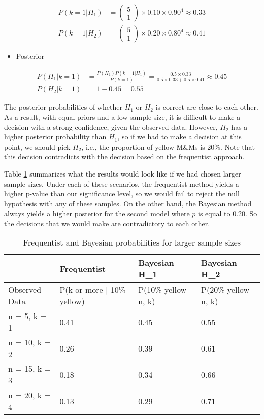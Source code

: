 \documentclass[]{book}
\providecommand{\tightlist}{%
  \setlength{\itemsep}{0pt}\setlength{\parskip}{0pt}}
\theoremstyle{definition}
\theoremstyle{definition}
\theoremstyle{remark}
\begin{document}
\[\begin{aligned}
P(k=1 | H_1) &= \left( \begin{array}{c} 5 \\ 1 \end{array} \right) \times 0.10 \times 0.90^4 \approx 0.33 \\
P(k=1 | H_2) &= \left( \begin{array}{c} 5 \\ 1 \end{array} \right) \times 0.20 \times 0.80^4 \approx 0.41
\end{aligned}\]

\begin{itemize}
\tightlist
\item
  Posterior
\end{itemize}

\[\begin{aligned}
P(H_1 | k=1) &= \frac{P(H_1)P(k=1 | H_1)}{P(k=1)} = \frac{0.5 \times 0.33}{0.5 \times 0.33 + 0.5 \times 0.41} \approx 0.45 \\
P(H_2 | k=1) &= 1 - 0.45 = 0.55
\end{aligned}\]

The posterior probabilities of whether \(H_1\) or \(H_2\) is correct are
close to each other. As a result, with equal priors and a low sample
size, it is difficult to make a decision with a strong confidence, given
the observed data. However, \(H_2\) has a higher posterior probability
than \(H_1\), so if we had to make a decision at this point, we should
pick \(H_2\), i.e., the proportion of yellow M\&Ms is 20\%. Note that
this decision contradicts with the decision based on the frequentist
approach.

Table \ref{tab:freq-vs-bayes} summarizes what the results would look
like if we had chosen larger sample sizes. Under each of these
scenarios, the frequentist method yields a higher p-value than our
significance level, so we would fail to reject the null hypothesis with
any of these samples. On the other hand, the Bayesian method always
yields a higher posterior for the second model where \(p\) is equal to
0.20. So the decisions that we would make are contradictory to each
other.

\begin{table}

\caption{\label{tab:freq-vs-bayes}Frequentist and Bayesian probabilities for larger sample sizes}
\centering
\begin{tabular}[t]{llll}
\toprule
 & Frequentist & Bayesian H\_1 & Bayesian H\_2\\
\midrule
Observed Data & P(k or more | 10\% yellow) & P(10\% yellow | n, k) & P(20\% yellow | n, k)\\
n = 5, k = 1 & 0.41 & 0.45 & 0.55\\
n = 10, k = 2 & 0.26 & 0.39 & 0.61\\
n = 15, k = 3 & 0.18 & 0.34 & 0.66\\
n = 20, k = 4 & 0.13 & 0.29 & 0.71\\
\bottomrule
\end{tabular}
\end{table}
\end{document}
